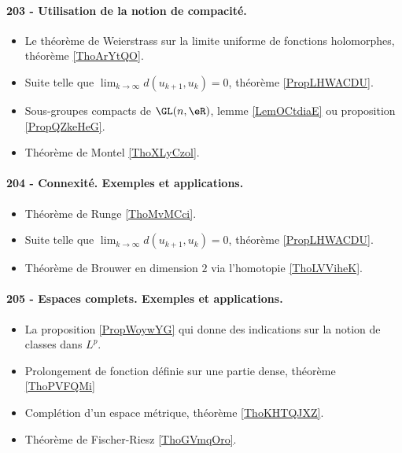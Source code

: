 \paragraph{203 - Utilisation de la notion de compacité.}
\begin{itemize}
    \item Le théorème de Weierstrass sur la limite uniforme de fonctions holomorphes, théorème \ref{ThoArYtQO}.
    \item Suite telle que \( \lim_{k\to \infty} d(u_{k+1},u_k)=0\), théorème \ref{PropLHWACDU}.
    \item Sous-groupes compacts de \( \GL(n,\eR)\), lemme \ref{LemOCtdiaE} ou proposition \ref{PropQZkeHeG}.
    \item Théorème de Montel \ref{ThoXLyCzol}.
\end{itemize}
\paragraph{204 - Connexité. Exemples et applications.}
\begin{itemize}
    \item Théorème de Runge \ref{ThoMvMCci}.
    \item Suite telle que \( \lim_{k\to \infty} d(u_{k+1},u_k)=0\), théorème \ref{PropLHWACDU}.
    \item Théorème de Brouwer en dimension \( 2\) via l'homotopie \ref{ThoLVViheK}.
\end{itemize}
\paragraph{205 - Espaces complets. Exemples et applications.}
\begin{itemize}
    \item La proposition \ref{PropWoywYG} qui donne des indications sur la notion de classes dans \( L^p\).
    \item Prolongement de fonction définie sur une partie dense, théorème \ref{ThoPVFQMi}
    \item Complétion d'un espace métrique, théorème \ref{ThoKHTQJXZ}.
    \item Théorème de Fischer-Riesz \ref{ThoGVmqOro}.
\end{itemize}
